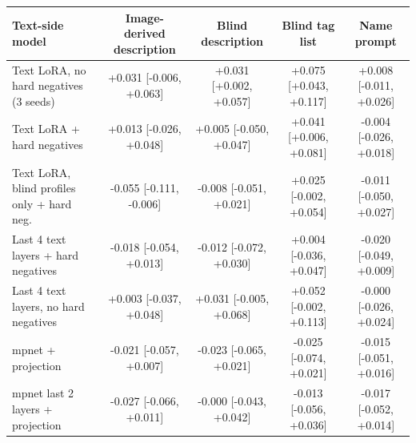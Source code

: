 \begin{tabular}{lcccc}\toprule Text-side model & Image-derived description & Blind description & Blind tag list & Name prompt\\\midrule
Text LoRA, no hard negatives (3 seeds) & +0.031 [-0.006, +0.063] & +0.031 [+0.002, +0.057] & +0.075 [+0.043, +0.117] & +0.008 [-0.011, +0.026]\\
Text LoRA + hard negatives & +0.013 [-0.026, +0.048] & +0.005 [-0.050, +0.047] & +0.041 [+0.006, +0.081] & -0.004 [-0.026, +0.018]\\
Text LoRA, blind profiles only + hard neg. & -0.055 [-0.111, -0.006] & -0.008 [-0.051, +0.021] & +0.025 [-0.002, +0.054] & -0.011 [-0.050, +0.027]\\
Last 4 text layers + hard negatives & -0.018 [-0.054, +0.013] & -0.012 [-0.072, +0.030] & +0.004 [-0.036, +0.047] & -0.020 [-0.049, +0.009]\\
Last 4 text layers, no hard negatives & +0.003 [-0.037, +0.048] & +0.031 [-0.005, +0.068] & +0.052 [-0.002, +0.113] & -0.000 [-0.026, +0.024]\\
mpnet + projection & -0.021 [-0.057, +0.007] & -0.023 [-0.065, +0.021] & -0.025 [-0.074, +0.021] & -0.015 [-0.051, +0.016]\\
mpnet last 2 layers + projection & -0.027 [-0.066, +0.011] & -0.000 [-0.043, +0.042] & -0.013 [-0.056, +0.036] & -0.017 [-0.052, +0.014]\\
\bottomrule\end{tabular}
